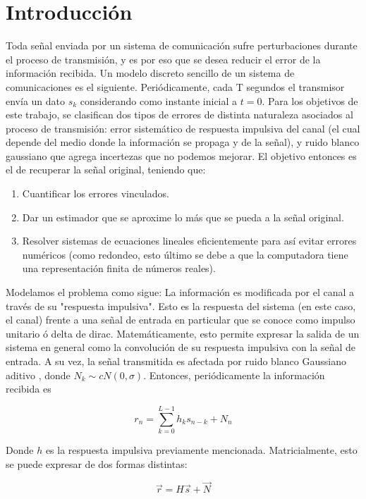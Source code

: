 \section{Introducci\'on}
Toda se\~nal enviada por un sistema de comunicaci\'on sufre perturbaciones durante el proceso de transmisi\'on, y es por eso que se desea reducir el error de la informaci\'on recibida.
Un modelo discreto sencillo de un sistema de comunicaciones es el siguiente. Peri\'odicamente, cada T segundos el transmisor env\'ia un dato $s_k$ considerando como instante inicial a $t = 0$. Para los objetivos de este trabajo, se clasifican dos tipos de errores de distinta naturaleza asociados al proceso de transmisi\'on: error sistemático de respuesta impulsiva del canal (el cual depende del medio donde la información se propaga y de la se\~nal), y ruido blanco gaussiano que agrega incertezas que no podemos mejorar. El objetivo entonces es el de recuperar la se\~nal original, teniendo que:
\begin{enumerate}
	\item Cuantificar los errores vinculados.
	\item Dar un estimador que se aproxime lo más que se pueda a la se\~nal original.
	\item Resolver sistemas de ecuaciones lineales eficientemente para as\'i evitar errores num\'ericos (como redondeo, esto \'ultimo se debe a que la computadora tiene una representaci\'on finita de n\'umeros reales).
\end{enumerate}

 Modelamos el problema como sigue: La informaci\'on es modificada por el canal a través de su "respuesta impulsiva". Esto es la respuesta del sistema (en este caso, el canal) frente a una se\~nal de entrada en particular que se conoce como impulso unitario \'o delta de dirac. Matem\'aticamente, esto permite expresar la salida de un sistema en general como la convoluci\'on de su respuesta impulsiva con la se\~nal de entrada.
A su vez, la señal transmitida es afectada por ruido blanco Gaussiano aditivo , donde $N_k \sim cN(0,\sigma)$. Entonces, peri\'odicamente la informaci\'on recibida es 

\begin{equation*} 
r_n = \sum_{k=0}^{L-1} h_k s_{n-k} + N_n 
\end{equation*} 

Donde $h$  es la respuesta impulsiva previamente mencionada. Matricialmente, esto se puede expresar de dos formas distintas:

\begin{equation}  
\vec{r} = H \vec{s} + \vec{N} 
\label{eq: r=hs+n}
\end{equation} 

